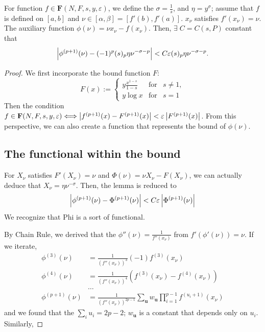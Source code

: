 \begin{lemma}
    For function $f \in \mathbf{F}(N, F, s, y, \varepsilon)$, we define the $\sigma = \frac{1}{s}$, and $\eta = y^\sigma$; assume that $f$ is defined on $[a, b]$ and $\nu \in [\alpha, \beta] = [f'(b), f'(a)]$. $x_\nu$ satisfies $f'(x_\nu) = \nu$. The auxiliary function $\phi(\nu) = \nu x_\nu - f(x_\nu)$. Then, $\exists \; C = C(s, P)$ constant that $$\left\lvert \phi^{(p+1)}(\nu) - (-1)^p (s)_p \eta \nu^{-\sigma-p} \right\rvert < C \varepsilon (s)_p \eta \nu^{-\sigma-p}.$$
\end{lemma}

\begin{proof} We first incorporate the bound function $F$: 
$$F(x) := \left\{
\begin{array}{rcl}
    y \frac{x^{1-s}}{1-s} & \text{for} & s \neq 1, \\
    y \log x & \text{for} & s = 1
\end{array}
\right.$$
Then the condition $f \in \mathbf{F}(N, F, s, y, \varepsilon) \Longleftrightarrow \left\lvert f^{(p+1)}(x) - F^{(p+1)}(x) \right\rvert < \varepsilon \left\lvert F^{(p+1)}(x) \right\rvert$. From this perspective, we can also create a function that represents the bound of $\phi(\nu).$
\subsection*{The functional within the bound}
For $X_\nu$ satisfies $F'(X_\nu) = \nu$ and $\Phi(\nu) = \nu X_\nu - F(X_\nu)$, we can actually deduce that $X_\nu = \eta \nu^{-\sigma}$. Then, the lemma is reduced to 
\begin{equation}
    \left\lvert \phi^{(p+1)}(\nu) - \Phi^{(p+1)}(\nu) \right\rvert < C\varepsilon \left\lvert \Phi^{(p+1)}(\nu) \right\rvert
\end{equation}
We recognize that Phi is a sort of functional. 

By Chain Rule, we derived that the $\phi''(\nu) = \frac{1}{f''(x_\nu)}$ from $f'(\phi'(\nu)) = \nu$. If we iterate, 
\begin{align*}
    \phi^{(3)}(\nu) &= \frac{1}{(f''(x_\nu))^3} (-1)f^{(3)}(x_\nu) \\
    \phi^{(4)}(\nu) &= \frac{1}{(f''(x_\nu))^4} (f^{(3)}(x_\nu) - f^{(4)}(x_\nu)) \\ 
    &\dots \\
    \phi^{(p+1)}(\nu) &= \frac{1}{(f''(x_\nu))^{2p-1}} \sum_{\mathbf{u}} w_\mathbf{u} \prod_{i = 1}^{p-1} f^{(u_i+1)}(x_\nu)
\end{align*}
and we found that the $\sum_i u_i = 2p-2$; $w_\mathbf{u}$ is a constant that depends only on $u_i$. Similarly, 


\end{proof}
